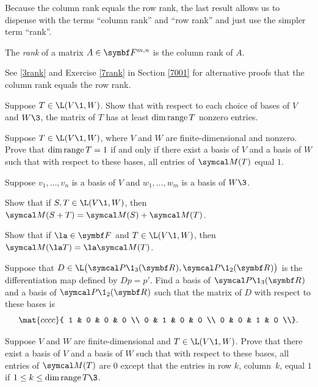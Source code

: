 \pagebreak[3]

Because the column rank equals the row rank, the last result allows us to dispense with the terms ``column rank'' and ``row rank'' and just use the simpler term ``rank''\!.

{The \emph{rank} of a matrix $A \in \F{m,n}$ is the column rank of $A$.}

See \ref{3rank} and Exercise \ref{7rank} in Section \ref{7001} for alternative proofs that the column rank equals the row rank.

\begin{exercises}

\exercise
Suppose $T \in \L(V\1, W)$. Show that with respect to each choice of bases of $V$ and $W\3$, the matrix of $T$ has at least $\dim \operatorname{range} T$ nonzero entries.


\exercise
Suppose $T \in \L(V\1, W)$, where $V$ and $W$ are finite-dimensional and nonzero. Prove that $\dim \operatorname{range} T = 1$ if and only if there exist a basis of $V$ and a basis of $W$ such that with respect to these bases, all entries of $\M(T)$ equal $1$.


\exercise
Suppose $v_1, \ldots, v_n$ is a basis of $V$ and $w_1, \ldots, w_m$ is a basis of $W\3$.
\begin{subtheorem}
\item
Show that if $S, T \in \L(V\1, W)$, then $\M(S+T) = \M(S) + \M(T)$.
\item
Show that if $\la \in \F{}$ and $T \in \L(V\1, W)$, then $\M(\la T) = \la \M(T)$.
\end{subtheorem}


\exercise
Suppose that $D \in \L\bigl(\P\1_3(\R{}), \P\1_2(\R{}) \bigr)$ is the differentiation map defined by \mbox{$Dp = p'\!$}. Find a basis of $\P\1_3(\R{})$ and a basis of $\P\1_2(\R{})$ such that the matrix of $D$ with respect to these bases is
\[
\mat{cccc}{
1 & 0 & 0 & 0 \\
0 & 1 & 0 & 0 \\
0 & 0 & 1 & 0 \\}.
\]
\vspace{-.15in}


\exercise
Suppose $V$ and $W$ are finite-dimensional and $T \in \L(V\1, W)$. Prove that there exist a basis of $V$ and a basis of $W$ such that with respect to these bases, all entries of $\M(T)$ are $0$ except that the entries in row $k$, column~$k$, equal $1$ if $1 \le k \le \dim \ran T\3$. \label{zeroonematrix}



\end{exercises}
